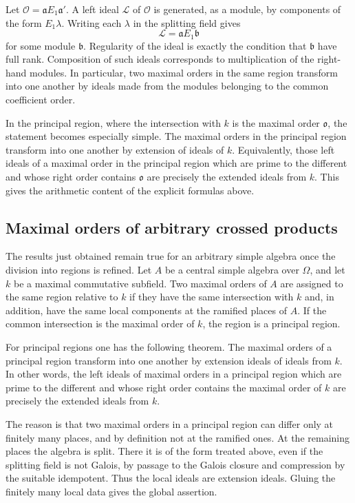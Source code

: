 \documentclass[11pt]{article}
\begin{document}
Let \(\mathcal O=\mathfrak aE_1\mathfrak a'\). A left ideal \(\mathcal L\) of \(\mathcal O\) is generated, as a module, by components of the form \(E_1\lambda\). Writing each \(\lambda\) in the splitting field gives
\[
  \mathcal L=\mathfrak aE_1\mathfrak b
\]
for some module \(\mathfrak b\). Regularity of the ideal is exactly the condition that \(\mathfrak b\) have full rank. Composition of such ideals corresponds to multiplication of the right-hand modules. In particular, two maximal orders in the same region transform into one another by ideals made from the modules belonging to the common coefficient order.

In the principal region, where the intersection with \(k\) is the maximal order \(\mathfrak o\), the statement becomes especially simple. The maximal orders in the principal region transform into one another by extension of ideals of \(k\). Equivalently, those left ideals of a maximal order in the principal region which are prime to the different and whose right order contains \(\mathfrak o\) are precisely the extended ideals from \(k\). This gives the arithmetic content of the explicit formulas above.

\subsection{Maximal orders of arbitrary crossed products}

The results just obtained remain true for an arbitrary simple algebra once the division into regions is refined. Let \(A\) be a central simple algebra over \(\Omega\), and let \(k\) be a maximal commutative subfield. Two maximal orders of \(A\) are assigned to the same region relative to \(k\) if they have the same intersection with \(k\) and, in addition, have the same local components at the ramified places of \(A\). If the common intersection is the maximal order of \(k\), the region is a principal region.

For principal regions one has the following theorem. The maximal orders of a principal region transform into one another by extension ideals of ideals from \(k\). In other words, the left ideals of maximal orders in a principal region which are prime to the different and whose right order contains the maximal order of \(k\) are precisely the extended ideals from \(k\).

The reason is that two maximal orders in a principal region can differ only at finitely many places, and by definition not at the ramified ones. At the remaining places the algebra is split. There it is of the form treated above, even if the splitting field is not Galois, by passage to the Galois closure and compression by the suitable idempotent. Thus the local ideals are extension ideals. Gluing the finitely many local data gives the global assertion.
\end{document}
